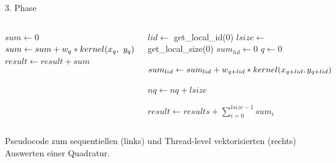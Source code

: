 \documentclass[10pt]{beamer}
\begin{document}
\begin{frame}{3. Phase}
  \begin{columns}
      \begin{algorithm}[H]
        \small{
          \( sum \gets 0 \) \;
          {
            \( sum \gets sum + w_{q} * kernel\relax(x_{q}, \ y_{q}) \) \;
          }
          \( result \gets result + sum \) \;
        }
      \end{algorithm}
      \begin{algorithm}[H]
        \small{
        \( lid \gets \) get\_local\_id\relax(0) \;
        \( lsize \gets \) get\_local\_size\relax(0) \;
        \( sum_{lid} \gets 0 \) \;
        \( q \gets 0 \) \;
        {
          {
            \( sum_{lid} \gets sum_{lid} + w_{q + lid} *
               kernel\relax(x_{q + lid}, y_{q + lid}) \) \;
          }

          \( nq \gets nq + lsize \) \;
        }

        \( result \gets results + \sum\limits_{i = 0}^{lsize - 1} sum_{i} \) \;
        }
      \end{algorithm}
  \end{columns}
  \begin{center}
    Pseudocode zum sequentiellen (links) und Thread-level vektorisierten
    (rechts) Auswerten einer Quadratur.
  \end{center}
\end{frame}
\end{document}
